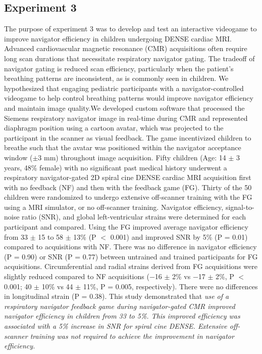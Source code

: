 \subsection{Experiment 3}
	The purpose of experiment 3 was to develop and test an interactive videogame to improve navigator efficiency in children undergoing DENSE cardiac MRI. Advanced cardiovascular magnetic resonance (CMR) acquisitions often require long scan durations that necessitate respiratory navigator gating. The tradeoff of navigator gating is reduced scan efficiency, particularly when the patient’s breathing patterns are inconsistent, as is commonly seen in children. We hypothesized that engaging pediatric participants with a navigator-controlled videogame to help control breathing patterns would improve navigator efficiency and maintain image quality.We developed custom software that processed the Siemens respiratory navigator image in real-time during CMR and represented diaphragm position using a cartoon avatar, which was projected to the participant in the scanner as visual feedback. The game incentivized children to breathe such that the avatar was positioned within the navigator acceptance window ($\pm$3 mm) throughout image acquisition. Fifty children (Age: 14 $\pm$ 3 years, 48\% female) with no significant past medical history underwent a respiratory navigator-gated 2D spiral cine DENSE cardiac MRI acquisition first with no feedback (NF) and then with the feedback game (FG). Thirty of the 50 children were randomized to undergo extensive off-scanner training with the FG using a MRI simulator, or no off-scanner training. Navigator efficiency, signal-to-noise ratio (SNR), and global left-ventricular strains were determined for each participant and compared. Using the FG improved average navigator efficiency from 33 $\pm$ 15 to 58 $\pm$ 13\% (P $<$ 0.001) and improved SNR by 5\% (P = 0.01) compared to acquisitions with NF. There was no difference in navigator efficiency (P = 0.90) or SNR (P = 0.77) between untrained and trained participants for FG acquisitions. Circumferential and radial strains derived from FG acquisitions were slightly reduced compared to NF acquisitions (−16 $\pm$ 2\% vs −17 $\pm$ 2\%, P $<$ 0.001; 40 $\pm$ 10\% vs 44 $\pm$ 11\%, P = 0.005, respectively). There were no differences in longitudinal strain (P = 0.38). This study demonstrated that \textit{use of a respiratory navigator feedback game during navigator-gated CMR improved navigator efficiency in children from 33 to 5\%. This improved efficiency was associated with a 5\% increase in SNR for spiral cine DENSE. Extensive off-scanner training was not required to achieve the improvement in navigator efficiency.}
	
